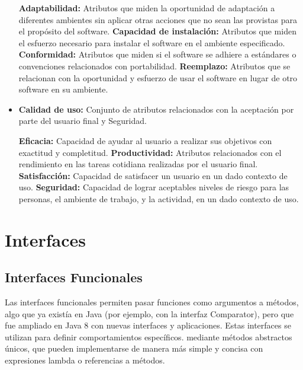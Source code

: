 \begin{center}
\begin{itemize}
       \subitem \textbf{ Adaptabilidad: } Atributos que miden la oportunidad de
            adaptación a diferentes ambientes sin aplicar otras
            acciones que no sean las provistas para el propósito del
            software.
        \subitem \textbf{Capacidad de instalación: } Atributos que miden el
            esfuerzo necesario para instalar el software en el
            ambiente especificado.
        \subitem \textbf{Conformidad: } Atributos que miden si el software se
            adhiere a estándares o convenciones relacionados con
            portabilidad.
        \subitem \textbf{Reemplazo: }Atributos que se relacionan con la
            oportunidad y esfuerzo de usar el software en lugar de
            otro software en su ambiente.

        \item \textbf{Calidad de uso:} Conjunto de atributos
        relacionados con la aceptación por parte del
        usuario final y Seguridad.

        \subitem \textbf{Eficacia: } Capacidad de ayudar al usuario a realizar sus
            objetivos con exactitud y completitud.
        \subitem \textbf{Productividad: }Atributos relacionados con el rendimiento
            en las tareas cotidiana realizadas por el usuario final.
        \subitem \textbf{Satisfacción: }Capacidad de satisfacer un usuario en un
            dado contexto de uso.
        \subitem \textbf{Seguridad: }Capacidad de lograr aceptables niveles de
            riesgo para las personas, el ambiente de trabajo, y la
            actividad, en un dado contexto de uso.

    \end{itemize}

    \section{Interfaces}
        \subsection{Interfaces Funcionales}
            Las interfaces funcionales permiten pasar funciones como argumentos a métodos, 
            algo que ya existía en Java (por ejemplo, con la interfaz Comparator), 
            pero que fue ampliado en Java 8 con nuevas interfaces y aplicaciones. 
            Estas interfaces se utilizan para definir comportamientos específicos.
            mediante métodos abstractos únicos, que pueden implementarse de manera más simple 
            y concisa con expresiones lambda o referencias a métodos.

\end{center}
